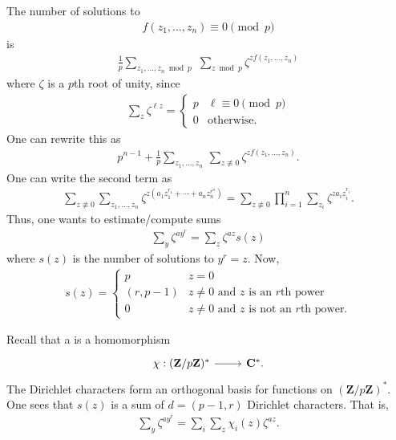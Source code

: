 \documentclass [11 pt, oneside] {article}
\begin{document}
The number of solutions to
\begin{align*}
	f(z_1,\hdots, z_{n}) \equiv 0\pmod p
\end{align*}
is 
\begin{align*}
	\frac{1}{p} \sum_{z_1,\hdots,z_{n} \bmod p}^{} \,\, \sum_{z\bmod p}^{} \zeta^{zf(z_1,\hdots,z_{n})}
\end{align*}
where $\zeta$ is a $p$th root of unity, since
\begin{align*}
	\sum_{z}^{} \zeta^{\ell z} =
	\begin{cases}
		p& \ell \equiv 0\pmod p\\
		0&\textrm{otherwise.}
	\end{cases}
\end{align*}
One can rewrite this as
\begin{align*}
	p^{n-1}+\frac{1}{p}\sum_{z_1,\hdots, z_{n}}^{} \, \sum_{z\not\equiv 0}^{} \zeta^{zf(z_1,\hdots,z_{n})}.
\end{align*}
One can write the second term as
\begin{align*}
	\sum_{z\not\equiv 0}^{} \sum_{z_1, \hdots,z_{n}}^{} \zeta^{z(a_1z_1^{r_1}+\cdots+a_{n}z_{n}^{r^{n}})} = \sum_{z\not\equiv 0}^{} \prod_{i=1}^{n} \sum_{z_{i}}^{} \zeta^{za_{i}z_{i}^{r_{i}}}.
\end{align*}
Thus, one wants to estimate/compute sums
\begin{align*}
	\sum_{y}^{} \zeta^{ay^{r}} = \sum_{z}^{} \zeta^{az}s(z)
\end{align*}
where $s(z)$ is the number of solutions to $y^{r}=z$. Now,
\begin{align*}
	s(z) = 
	\begin{cases}
		p & z =0\\
		(r,p-1) &\textrm{$z\ne 0$ and $z$ is an $r$th power}\\
		0 & \textrm{$z\ne 0$ and $z$ is not an $r$th power.}
	\end{cases}
\end{align*}

Recall that a  is a homomorphism
\[
\begin{tikzcd}
	\chi : (\mathbf{Z}/p\mathbf{Z}) ^{*}\ar[r]& \mathbf{C}^{*}.
\end{tikzcd}
\]
The Dirichlet characters form an orthogonal basis for functions on $(\mathbf{Z}/p\mathbf{Z})^{*}$.
One sees that $s(z)$ is a sum of $d=(p-1,r)$ Dirichlet characters. That is,
\begin{align*}
	\sum_{y}^{} \zeta^{ay^{r}} = \sum_{i}^{} \sum_{z}^{} \chi_{i}(z) \zeta^{az}.
\end{align*}
\end{document}
